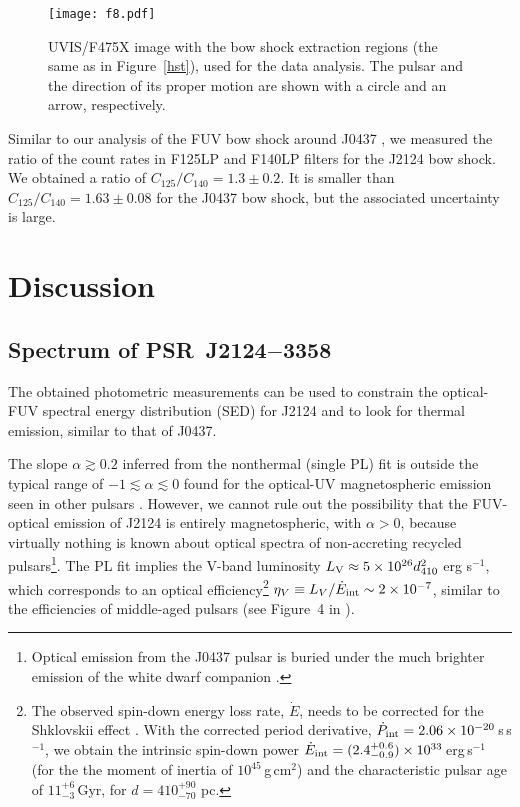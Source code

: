 \documentclass[iop]{emulateapj}
\begin{document}
\begin{figure}
\texttt{[image: f8.pdf]}
\caption{
UVIS/F475X image with the bow shock extraction regions (the same as in Figure~\ref{hst}), used for the 
data analysis. The pulsar and the direction of its proper motion are shown with a circle and an arrow, respectively. 
}
\label{f475x}
\end{figure}


Similar to our analysis of the FUV bow shock around J0437 \citep{2016ApJ...831..129R}, we measured the ratio of the count rates in F125LP and F140LP filters for the J2124 bow shock. We obtained a ratio of $C_{125}/C_{140}=1.3\pm0.2$. It is smaller than $C_{125}/C_{140}=1.63\pm0.08$ for the J0437 bow shock, but the associated uncertainty is large.  


\section{Discussion}

\subsection{Spectrum of PSR~J2124$-$3358}

The obtained photometric measurements can be used to constrain the optical-FUV spectral energy distribution (SED) for J2124 and to look for thermal emission, similar to that of J0437. 

The slope $\alpha \gtrsim 0.2$ inferred from  the nonthermal (single PL) fit is outside the typical range of $-1\lesssim\alpha\lesssim0$ found for the optical-UV magnetospheric emission seen in other pulsars  \citep{2007Ap&SS.308..287K,2011AdSpR..47.1281M}. However, we cannot rule out the possibility that the FUV-optical emission of J2124 is entirely magnetospheric, with $\alpha >0$, because virtually nothing is known about optical spectra of non-accreting recycled pulsars\footnote{Optical emission from the J0437 pulsar is buried under the much brighter emission of the white dwarf companion \citep{2012ApJ...746....6D}.}.  The  PL fit implies the V-band luminosity $L_{\rm V}\approx 5\times10^{26}d_{410}^2$ erg s$^{-1}$, which corresponds to an optical efficiency\footnote{The observed spin-down energy loss rate, $\dot{E}$, needs to be corrected for the Shklovskii effect \citep{1970SvA....13..562S}.  With the corrected  period derivative, $\dot{P}_{\rm int}=2.06\times10^{-20}$\,s\,s$^{-1}$, we obtain the intrinsic spin-down power $\dot{E}_{\rm int}=(2.4^{+0.6}_{-0.9})\times10^{33}$\,erg\,s$^{-1}$ (for the the moment of inertia of $10^{45}$\,g\,cm$^2$) and the characteristic pulsar age of $11_{-3}^{+6}$\,Gyr, for $d=410^{+90}_{-70}$ pc.} $\eta_V\equiv L_V/\dot E_{\rm int} \sim 2\times 10^{-7}$, similar to  the efficiencies of middle-aged pulsars (see Figure~4 in \citealt{2012A&A...540A..28D}).
 
\end{document}
